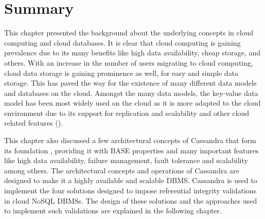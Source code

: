 













\section{Summary}



This chapter presented the background about the underlying concepts in cloud
computing and cloud databases.  It is clear that cloud computing is gaining
prevalence due to its many benefits like high data availability, cheap
storage, and others.  With an increase in the number of users
migrating to cloud computing,   cloud data storage is gaining prominence as well,  
for easy and simple data storage.  This has paved the way for the existence
of many different data models and databases on the cloud.  Amongst the many data
models, the key-value data model has been  most widely used  on the cloud
as it is more adapted to the cloud environment due to its support for
replication and scalability and other cloud related features (). 



This chapter also discussed a few  architectural concepts of Cassandra that form
its foundation , providing it with BASE properties and many important features like
high data availability, failure management, fault tolerance and scalability
among others.  
The architectural concepts and operations of Cassandra are designed to
make it a highly available and scalable \ac{DBMS}.
Cassandra is used to implement the four solutions
designed to impose referential integrity validations in cloud \ac{NoSQL}
\acp{DBMS}.  The design of these solutions  and the approaches used to
implement such validations are explained in the following chapter. 







